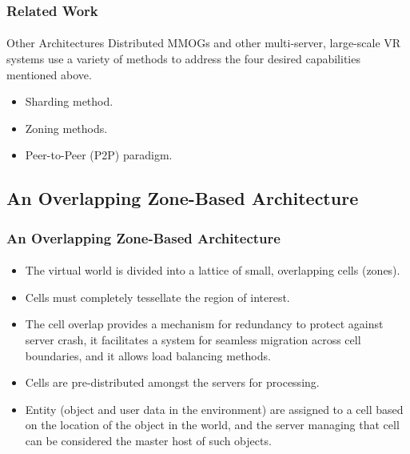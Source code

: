 \begin{frame}
\frametitle{Related Work}
\framesubtitle{}
\begin{block}{Other Architectures}
Distributed MMOGs and other multi-server, large-scale VR
systems use a variety of methods to address the four desired
capabilities mentioned above.
\begin{itemize}
\item
Sharding method.
\item
Zoning methods.
\item
Peer-to-Peer (P2P) paradigm.
\end{itemize}
\end{block}
\end{frame}

\subsection{An Overlapping Zone-Based Architecture}

\begin{frame}[fragile]
\frametitle{An Overlapping Zone-Based Architecture}
\framesubtitle{}
\begin{itemize}
\item<1->
The virtual world is divided into a lattice of small, \alert{overlapping
cells} (zones).
\item<2->
Cells must completely tessellate the region of interest.
\item<3->
The cell overlap provides a mechanism for redundancy to protect against server
crash, it facilitates a system for seamless migration across cell
boundaries, and it allows load balancing methods.
\item<4->
Cells are pre-distributed amongst the servers for processing.
\item<5->
Entity (object and user data in
the environment) are assigned to a cell based on the location of
the object in the world, and the server managing that cell can be
considered the \alert{master host} of such objects.
\end{itemize}
\end{frame}

